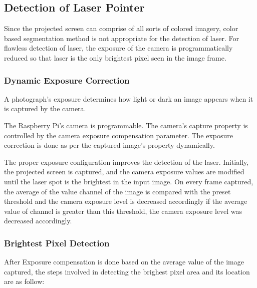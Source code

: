 \documentclass[12pt, a4paper]{article}
\begin{document}
\subsection{Detection of Laser Pointer}
	Since the projected screen can comprise of all sorts of colored imagery, color based segmentation method is not appropriate for the detection of laser. For flawless detection of laser, the exposure of the camera is programmatically reduced so that laser is the only brightest pixel seen in the image frame. 
	\subsubsection{Dynamic Exposure Correction}
	A photograph's exposure determines how light or dark an image appears when it is captured by the camera. 
	
	The Raspberry Pi's camera is programmable. The camera's capture property is controlled by the camera exposure compensation parameter. The exposure correction is done as per the captured image's property dynamically. 
	
	The proper exposure configuration improves the detection of the laser. Initially, the projected screen is captured, and the camera exposure values are modified until the laser spot is the brightest in the input image. On every frame captured, the average of the value channel of the image is compared with the preset threshold and the camera exposure level is decreased accordingly if the average value of channel is greater than this threshold, the camera exposure level was decreased accordingly. 
	
\subsubsection{Brightest Pixel Detection}
After Exposure compensation is done based on the average value of the image captured, the steps involved in detecting the brighest pixel area and its location are as follow:
\end{document}
